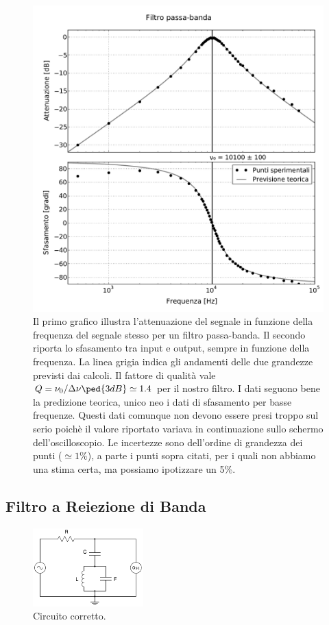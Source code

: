 \begin{figure}
  \includegraphics[scale=0.55]{passa_banda.pdf}
  \caption{Il primo grafico illustra l'attenuazione del segnale in funzione della frequenza del segnale stesso
    per un filtro passa-banda.
    Il secondo riporta lo sfasamento tra input e output, sempre in funzione della frequenza. La linea grigia indica
    gli andamenti delle due grandezze previsti dai calcoli. Il fattore di qualità vale
    $Q = \nu_0/\Delta \nu\ped{3dB} \simeq 1.4$ per il nostro filtro. I dati seguono bene la predizione teorica,
    unico neo i dati di sfasamento per basse frequenze. Questi dati comunque non devono essere presi troppo sul serio
    poichè il valore riportato variava in continuazione sullo schermo dell'oscilloscopio. Le incertezze sono dell'ordine
    di grandezza dei punti ($\simeq 1\%$), a parte i punti sopra citati, per i quali non abbiamo una stima certa,
    ma possiamo ipotizzare un 5\%.}
  \label{fig:g_banda}
\end{figure}

\subsection*{Filtro a Reiezione di Banda}

\begin{figure}
  \includegraphics[width=0.38\textwidth]{s_corr.pdf}
  \caption{Circuito corretto.}
  \label{fig:corr}
\end{figure}

